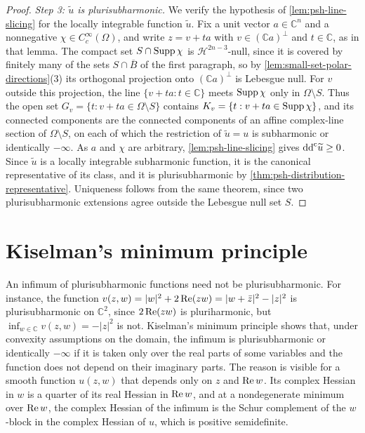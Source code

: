 \begin{proof}
\emph{Step 3: $\widetilde u$ is plurisubharmonic.} We verify the hypothesis of \cref{lem:psh-line-slicing} for the locally integrable function $\widetilde u$. Fix a unit vector $a\in\mathbb{C}^n$ and a nonnegative $\chi\in C^\infty_c(\Omega)$, and write $z=v+ta$ with $v\in(\mathbb{C}a)^\perp$ and $t\in\mathbb{C}$, as in that lemma. The compact set $S\cap\operatorname{Supp}\chi$ is $\mathcal H^{2n-3}$-null, since it is covered by finitely many of the sets $S\cap\overline B$ of the first paragraph, so by \cref{lem:small-set-polar-directions}(3) its orthogonal projection onto $(\mathbb{C}a)^\perp$ is Lebesgue null. For $v$ outside this projection, the line $\{v+ta:t\in\mathbb{C}\}$ meets $\operatorname{Supp}\chi$ only in $\Omega\setminus S$. Thus the open set $G_v=\{t:v+ta\in\Omega\setminus S\}$ contains $K_v=\{t:v+ta\in\operatorname{Supp}\chi\}$, and its connected components are the connected components of an affine complex-line section of $\Omega\setminus S$, on each of which the restriction of $\widetilde u=u$ is subharmonic or identically $-\infty$. As $a$ and $\chi$ are arbitrary, \cref{lem:psh-line-slicing} gives $\mathrm{dd}^{\mathrm{c}}\widetilde u\geq0$. Since $\widetilde u$ is a locally integrable subharmonic function, it is the canonical representative of its class, and it is plurisubharmonic by \cref{thm:psh-distribution-representative}. Uniqueness follows from the same theorem, since two plurisubharmonic extensions agree outside the Lebesgue null set $S$.
\end{proof}

\section{Kiselman's minimum principle}
\label{sec:kiselman-minimum}

An infimum of plurisubharmonic functions need not be plurisubharmonic. For instance, the function $v(z,w)=|w|^2+2\operatorname{Re}(zw)=|w+\bar z|^2-|z|^2$ is plurisubharmonic on $\mathbb{C}^2$, since $2\operatorname{Re}(zw)$ is pluriharmonic, but $\inf_{w\in\mathbb{C}}v(z,w)=-|z|^2$ is not. Kiselman's minimum principle shows that, under convexity assumptions on the domain, the infimum is plurisubharmonic or identically $-\infty$ if it is taken only over the real parts of some variables and the function does not depend on their imaginary parts. The reason is visible for a smooth function $u(z,w)$ that depends only on $z$ and $\operatorname{Re} w$. Its complex Hessian in $w$ is a quarter of its real Hessian in $\operatorname{Re} w$, and at a nondegenerate minimum over $\operatorname{Re} w$, the complex Hessian of the infimum is the Schur complement of the $w$-block in the complex Hessian of $u$, which is positive semidefinite.

